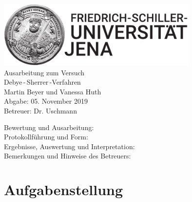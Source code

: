 \documentclass[a4paper,twoside,final]{article}
\begin{document}
\setlength{\marginparsep}{2em}
\renewcommand{\theequation}{\arabic{section}.\arabic{equation}}
\renewcommand{\thefigure}{\arabic{section}.\arabic{figure}}
\renewcommand{\thetable}{\arabic{section}.\arabic{table}}

\begin{center}
\thispagestyle{empty}
  \includegraphics[width=0.75\textwidth]{UniJena_BildWortMarke_black.pdf}\\[4em]
  \Large
  Ausarbeitung zum Versuch\\[2em]
  \Huge
  Debye\,-\,Sherrer\,-Verfahren\\
  \vspace{2cm}
  \Large
  Martin Beyer und Vanessa Huth\\[2em]
  Abgabe: 05. November 2019\\[2em]
  Betreuer: Dr. Uschmann\\[5em]
  \begin{flushleft}
  	Bewertung und Ausarbeitung:\\[2em]
		Protokollführung und Form:\\[1em]
		Ergebnisse, Auswertung und Interpretation:\\[1em]
		Bemerkungen und Hinweise des Betreuers:
  \end{flushleft}
\end{center}
\clearpage

\pagestyle{fancy}
\renewcommand{\headrulewidth}{0pt}
\renewcommand{\footrulewidth}{0.5pt}
\renewcommand{\sectionmark}[1]{\markright{#1}}
\fancyhead[RE,LO]{\rightmark}
\fancyfoot[LE,RO]{\bfseries\thepage}
\renewcommand{\headrulewidth}{0.5pt}
\renewcommand{\footrulewidth}{0.5pt}

\setcounter{equation}{0}
\setcounter{figure}{0}

\tableofcontents
\newpage
\section{Aufgabenstellung} \label{sec:Aufgabenstellung}
\end{document}
